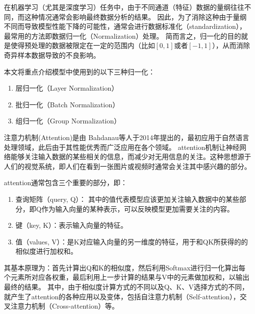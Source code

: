 在机器学习（尤其是深度学习）任务中，由于不同通道（特征）数据的量纲往往不同，而这种情况通常会影响最终数据分析的结果。
因此，为了消除这种由于量纲不同而导致模型性能下降的可能性，通常会进行数据标准化（standardization），最常用的方法即数据归一化（Normalization）处理。
简而言之，归一化的目的就是使得预处理的数据被限定在一定的范围内（比如$[0,1]$或者$[-1,1]$），从而消除奇异样本数据导致的不良影响。

本文将重点介绍模型中使用到的以下三种归一化：
\begin{enumerate}
  \item 层归一化（Layer Normalization）
  \item 批归一化（Batch Normalization）
  \item 组归一化（Group Normalization）
\end{enumerate}


注意力机制(Attention)是由 Bahdanau等人于2014年提出的\cite{2014Neural}，最初应用于自然语言处理领域，此后由于其性能优秀而广泛应用在各个领域。
attention机制让神经网络能够关注输入数据的某些相关的信息，而减少对无用信息的关注。这种思想源于人们的视觉系统，即人们在看到一张图片或视频时通常会关注其中感兴趣的部分。

attention通常包含三个重要的部分，即：
\begin{enumerate}
  \item 查询矩阵（query, Q）： 其中的值代表模型应该更加关注输入数据中的某些部分，即Q作为输入向量的某种表示，可以反映模型更加需要关注的内容。
  \item 键（key, K）：表示输入向量的特征。
  \item 值（values, V）：是K对应输入向量的另一维度的特征，用于和QK所获得的的相似度进行加权和。
\end{enumerate}

其基本原理为：首先计算出Q和K的相似度，然后利用Softmax进行归一化算出每个元素所对应各权重，最后利用上一步计算的结果与V中的元素做加权和，以输出最终的结果。
其中，由于相似度计算方式的不同以及Q、K、V选择方式的不同，就产生了attention的各种应用以及变体，包括自注意力机制（Self-attention），交叉注意力机制（Cross-attention）等。


\

\

